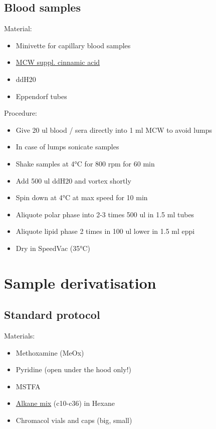 \documentclass[]{book}
\providecommand{\tightlist}{%
  \setlength{\itemsep}{0pt}\setlength{\parskip}{0pt}}
\theoremstyle{definition}
\theoremstyle{definition}
\theoremstyle{definition}
\theoremstyle{remark}
\begin{document}
\subsection{Blood samples}\label{blood-samples}

Material:

\begin{itemize}
\tightlist
\item
  Minivette for capillary blood samples
\item
  \protect\hyperlink{mcw}{MCW suppl. cinnamic acid}
\item
  ddH20
\item
  Eppendorf tubes
\end{itemize}

Procedure:

\begin{itemize}
\tightlist
\item
  Give 20 ul blood / sera directly into 1 ml MCW to avoid lumps
\item
  In case of lumps sonicate samples
\item
  Shake samples at 4°C for 800 rpm for 60 min
\item
  Add 500 ul ddH20 and vortex shortly
\item
  Spin down at 4°C at max speed for 10 min
\item
  Aliquote polar phase into 2-3 times 500 ul in 1.5 ml tubes
\item
  Aliquote lipid phase 2 times in 100 ul lower in 1.5 ml eppi
\item
  Dry in SpeedVac (35°C)
\end{itemize}

\section{Sample derivatisation}\label{sample-derivatisation}

\subsection{Standard protocol}\label{standard-protocol}

Materials:

\begin{itemize}
\tightlist
\item
  Methoxamine (MeOx)
\item
  Pyridine (open under the hood only!)
\item
  MSTFA
\item
  \protect\hyperlink{alkanemix}{Alkane mix} (c10-c36) in Hexane
\item
  Chromacol vials and caps (big, small)
\end{itemize}
\end{document}
